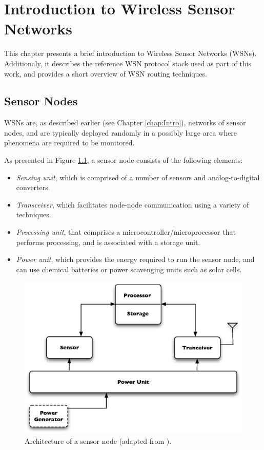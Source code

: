 \chapter{Introduction to Wireless Sensor Networks} \label{chap:IntroWSN}
This chapter presents a brief introduction to Wireless Sensor Networks (WSNs).
Additionaly, it describes the reference WSN protocol stack used as part of this
work, and provides a short overview of WSN routing techniques.

\section{Sensor Nodes} \label{subsec:sensornodes}
WSNs are, as described earlier (see Chapter \ref{chap:Intro}), networks of sensor
nodes, and are typically deployed randomly in a possibly large area where
phenomena are required to be monitored.

As presented in Figure \ref{Fig:SensorNodeArch}, a sensor node consists of
the following elements:
\begin{itemize}
  \item \emph{Sensing unit}, which is comprised of a number of sensors and
  analog-to-digital converters. 
  \item \emph{Transceiver}, which facilitates node-node communication using 
a variety of techniques.
  \item \emph{Processing unit}, that comprises a 
microcontroller/microprocessor that performs processing, and is associated with 
a storage unit.
  \item \emph{Power unit}, which provides the energy required to run the sensor node, and can use chemical 
batteries or power scavenging units such as solar cells.
\end{itemize}

\begin{figure}[h]
\centering
\includegraphics[scale=0.65]{img/SensorNodeArch.eps} 
\caption[Architecture of a sensor node] {Architecture of a sensor node (adapted from \cite{SensorSurveyAkyildiz:2002}).}
\label{Fig:SensorNodeArch}
\end{figure} 

